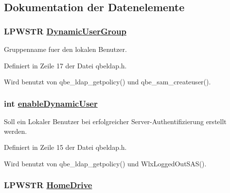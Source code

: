 \subsection{Dokumentation der Datenelemente}
\hypertarget{structQbeSAS__HostPolicy_QbeSAS__HostPolicyo1}{
\subsubsection[DynamicUserGroup]{\setlength{\rightskip}{0pt plus 5cm}LPWSTR \hyperlink{structQbeSAS__HostPolicy_QbeSAS__HostPolicyo1}{Dynamic\-User\-Group}}}
\label{structQbeSAS__HostPolicy_QbeSAS__HostPolicyo1}


Gruppenname fuer den lokalen Benutzer. 



Definiert in Zeile 17 der Datei qbeldap.h.

Wird benutzt von qbe\_\-ldap\_\-getpolicy() und qbe\_\-sam\_\-createuser().\hypertarget{structQbeSAS__HostPolicy_QbeSAS__HostPolicyo0}{
\subsubsection[enableDynamicUser]{\setlength{\rightskip}{0pt plus 5cm}int \hyperlink{structQbeSAS__HostPolicy_QbeSAS__HostPolicyo0}{enable\-Dynamic\-User}}}
\label{structQbeSAS__HostPolicy_QbeSAS__HostPolicyo0}


Soll ein Lokaler Benutzer bei erfolgreicher Server-Authentifizierung erstellt werden. 



Definiert in Zeile 15 der Datei qbeldap.h.

Wird benutzt von qbe\_\-ldap\_\-getpolicy() und Wlx\-Logged\-Out\-SAS().\hypertarget{structQbeSAS__HostPolicy_QbeSAS__HostPolicyo3}{
\subsubsection[HomeDrive]{\setlength{\rightskip}{0pt plus 5cm}LPWSTR \hyperlink{structQbeSAS__HostPolicy_QbeSAS__HostPolicyo3}{Home\-Drive}}}
\label{structQbeSAS__HostPolicy_QbeSAS__HostPolicyo3}


